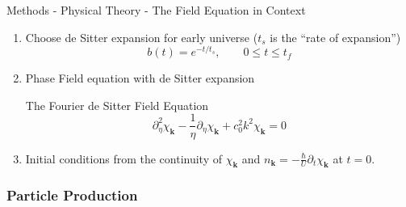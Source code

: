 \documentclass[aspectratio=169]{beamer}
\begin{document}
            \begin{frame}{Methods - Physical Theory - The Field Equation in Context}
                \begin{enumerate}\addtocounter{enumi}{2}
                    \item Choose de Sitter expansion for early universe ($t_s$ is the ``rate of expansion'')
                        \begin{equation}
                            b(t) = e^{-t/t_s}, \qquad 0 \leq t \leq t_f
                        \end{equation}
                        \vspace{-0.5in}
                    \item Phase Field equation with de Sitter expansion
                        \begin{exampleblock}{\centering The Fourier de Sitter Field Equation}
                            \begin{equation} \label{eq:fieldEquationdeSitter}
                                \partial_\eta^2 \chi_\mathbf{k} - \frac{1}{\eta} \partial_\eta \chi_\mathbf{k} + c_0^2 k^2 \chi_\mathbf{k} = 0
                            \end{equation}
                        \end{exampleblock}
                    \item Initial conditions from the continuity of $\chi_\mathbf{k}$ and $n_\mathbf{k} = - \frac{\hbar}{U} \partial_t \chi_\mathbf{k}$ at $t = 0$.
                \end{enumerate}
            \end{frame}

        \subsubsection{Particle Production}
\end{document}
